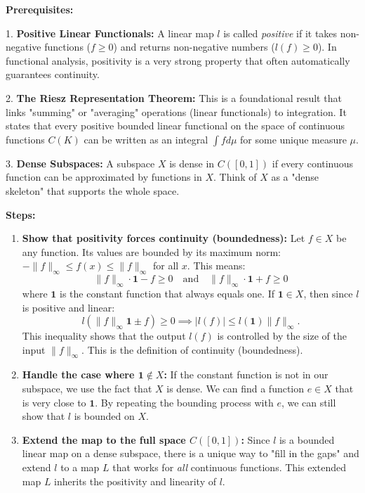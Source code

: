 \begin{solution}
\textbf{Prerequisites:}

1. \textbf{Positive Linear Functionals:} A linear map $l$ is called \textit{positive} if it takes non-negative functions ($f \geq 0$) and returns non-negative numbers ($l(f) \geq 0$). In functional analysis, positivity is a very strong property that often automatically guarantees continuity.

2. \textbf{The Riesz Representation Theorem:} This is a foundational result that links "summing" or "averaging" operations (linear functionals) to integration. It states that every positive bounded linear functional on the space of continuous functions $C(K)$ can be written as an integral $\int f d\mu$ for some unique measure $\mu$.

3. \textbf{Dense Subspaces:} A subspace $X$ is dense in $C([0, 1])$ if every continuous function can be approximated by functions in $X$. Think of $X$ as a "dense skeleton" that supports the whole space.


\textbf{Steps:}
\begin{enumerate}
    \item \textbf{Show that positivity forces continuity (boundedness):}
        Let $f \in X$ be any function. Its values are bounded by its maximum norm: $-\|f\|_\infty \leq f(x) \leq \|f\|_\infty$ for all $x$. This means:
        \[ \|f\|_\infty \cdot \mathbf{1} - f \geq 0 \quad \text{and} \quad \|f\|_\infty \cdot \mathbf{1} + f \geq 0 \]
        where $\mathbf{1}$ is the constant function that always equals one. If $\mathbf{1} \in X$, then since $l$ is positive and linear:
        \[ l(\|f\|_\infty \mathbf{1} \pm f) \geq 0 \implies |l(f)| \leq l(\mathbf{1}) \|f\|_\infty. \]
        This inequality shows that the output $l(f)$ is controlled by the size of the input $\|f\|_\infty$. This is the definition of continuity (boundedness).

    \item \textbf{Handle the case where $\mathbf{1} \notin X$:}
        If the constant function is not in our subspace, we use the fact that $X$ is dense. We can find a function $e \in X$ that is very close to $\mathbf{1}$. By repeating the bounding process with $e$, we can still show that $l$ is bounded on $X$.

    \item \textbf{Extend the map to the full space $C([0, 1])$:}
        Since $l$ is a bounded linear map on a dense subspace, there is a unique way to "fill in the gaps" and extend $l$ to a map $L$ that works for \textit{all} continuous functions. This extended map $L$ inherits the positivity and linearity of $l$.


\end{enumerate}
\end{solution}
